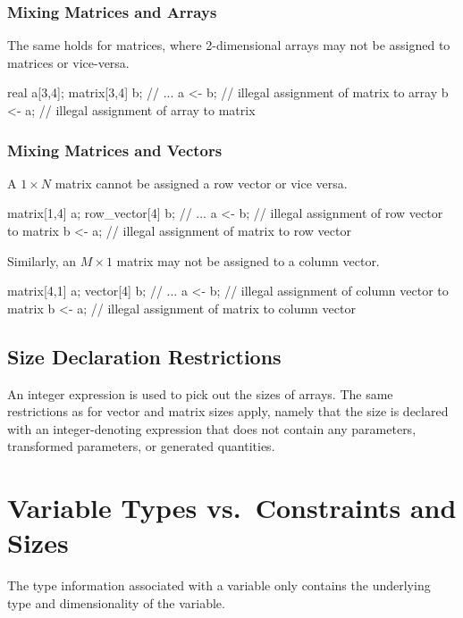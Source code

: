 \subsubsection{Mixing Matrices and Arrays}

The same holds for matrices, where 2-dimensional arrays may not be
assigned to matrices or vice-versa.

\begin{stancode}
real a[3,4];
matrix[3,4] b;
// ...
a <- b;  // illegal assignment of matrix to array
b <- a;  // illegal assignment of array to matrix
\end{stancode}
%

\subsubsection{Mixing Matrices and Vectors}

A $1 \times N$ matrix cannot be assigned a row vector or
vice versa.
%
\begin{stancode}
matrix[1,4] a;
row_vector[4] b;
// ...
a <- b;  // illegal assignment of row vector to matrix
b <- a;  // illegal assignment of matrix to row vector
\end{stancode}
%
Similarly, an $M \times 1$ matrix may not be assigned to a column vector.
%
\begin{stancode}
matrix[4,1] a;
vector[4] b;
// ...
a <- b;  // illegal assignment of column vector to matrix
b <- a;  // illegal assignment of matrix to column vector
\end{stancode}

\subsection{Size Declaration Restrictions}

An integer expression is used to pick out the sizes of arrays.  The
same restrictions as for vector and matrix sizes apply, namely that
the size is declared with an integer-denoting expression that does not
contain any parameters, transformed parameters, or generated quantities.




\section{Variable Types vs.\ Constraints and Sizes}

The type information associated with a variable only contains the
underlying type and dimensionality of the variable.

